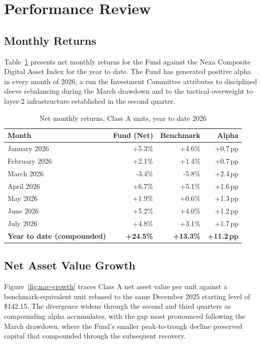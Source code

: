 \section{Performance Review}

\subsection{Monthly Returns}

Table~\ref{tab:monthly-returns} presents net monthly returns for the Fund against the Nexa Composite Digital Asset Index for the year to date. The Fund has generated positive alpha in every month of 2026, a run the Investment Committee attributes to disciplined sleeve rebalancing during the March drawdown and to the tactical overweight to layer-2 infrastructure established in the second quarter.

\begin{table}[H]
\centering
\small
\caption{Net monthly returns, Class A units, year to date 2026}
\label{tab:monthly-returns}
\begin{tabular}{@{}lrrr@{}}
\toprule
\textbf{Month} & \textbf{Fund (Net)} & \textbf{Benchmark} & \textbf{Alpha} \\
\midrule
January 2026 & +5.3\% & +4.6\% & +0.7\,pp \\
February 2026 & +2.1\% & +1.4\% & +0.7\,pp \\
March 2026 & -3.4\% & -5.8\% & +2.4\,pp \\
April 2026 & +6.7\% & +5.1\% & +1.6\,pp \\
May 2026 & +1.9\% & +0.6\% & +1.3\,pp \\
June 2026 & +5.2\% & +4.0\% & +1.2\,pp \\
July 2026 & +4.8\% & +3.1\% & +1.7\,pp \\
\midrule
\textbf{Year to date (compounded)} & \textbf{+24.5\%} & \textbf{+13.3\%} & \textbf{+11.2\,pp} \\
\bottomrule
\end{tabular}
\end{table}

\subsection{Net Asset Value Growth}

Figure~\ref{fig:nav-growth} traces Class A net asset value per unit against a benchmark-equivalent unit rebased to the same December 2025 starting level of \$142.15. The divergence widens through the second and third quarters as compounding alpha accumulates, with the gap most pronounced following the March drawdown, where the Fund's smaller peak-to-trough decline preserved capital that compounded through the subsequent recovery.

